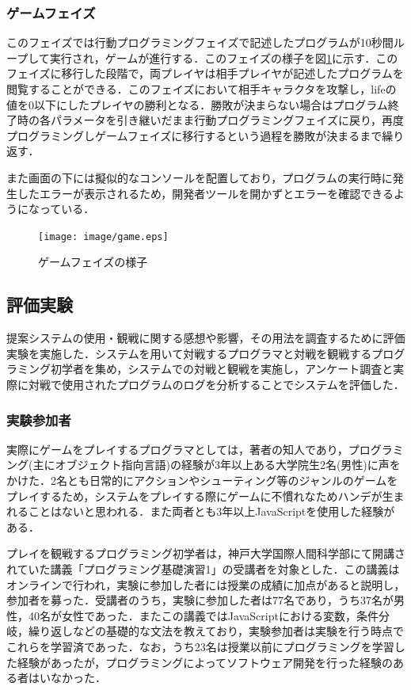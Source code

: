 \subsubsection{ゲームフェイズ}
このフェイズでは行動プログラミングフェイズで記述したプログラムが10秒間ループして実行され，ゲームが進行する．このフェイズの様子を図\ref{game}に示す．このフェイズに移行した段階で，両プレイヤは相手プレイヤが記述したプログラムを閲覧することができる．このフェイズにおいて相手キャラクタを攻撃し，lifeの値を0以下にしたプレイヤの勝利となる．勝敗が決まらない場合はプログラム終了時の各パラメータを引き継いだまま行動プログラミングフェイズに戻り，再度プログラミングしゲームフェイズに移行するという過程を勝敗が決まるまで繰り返す．

また画面の下には擬似的なコンソールを配置しており，プログラムの実行時に発生したエラーが表示されるため，開発者ツールを開かずとエラーを確認できるようになっている．

\begin{figure}[!ht]
  \begin{center}
    \texttt{[image: image/game.eps]}
  \end{center}
    \vspace{-8mm} 
  \caption{ゲームフェイズの様子}
  \label{game}
\end{figure}

\subsection{評価実験}
提案システムの使用・観戦に関する感想や影響，その用法を調査するために評価実験を実施した．システムを用いて対戦するプログラマと対戦を観戦するプログラミング初学者を集め，システムでの対戦と観戦を実施し，アンケート調査と実際に対戦で使用されたプログラムのログを分析することでシステムを評価した．

\subsubsection{実験参加者}
実際にゲームをプレイするプログラマとしては，著者の知人であり，プログラミング(主にオブジェクト指向言語)の経験が3年以上ある大学院生2名(男性)に声をかけた．2名とも日常的にアクションやシューティング等のジャンルのゲームをプレイするため，システムをプレイする際にゲームに不慣れなためハンデが生まれることはないと思われる．また両者とも3年以上JavaScriptを使用した経験がある．

プレイを観戦するプログラミング初学者は，神戸大学国際人間科学部にて開講されていた講義「プログラミング基礎演習1」の受講者を対象とした．この講義はオンラインで行われ，実験に参加した者には授業の成績に加点があると説明し，参加者を募った．受講者のうち，実験に参加した者は77名であり，うち37名が男性，40名が女性であった．またこの講義ではJavaScriptにおける変数，条件分岐，繰り返しなどの基礎的な文法を教えており，実験参加者は実験を行う時点でこれらを学習済であった．なお，うち23名は授業以前にプログラミングを学習した経験があったが，プログラミングによってソフトウェア開発を行った経験のある者はいなかった．

